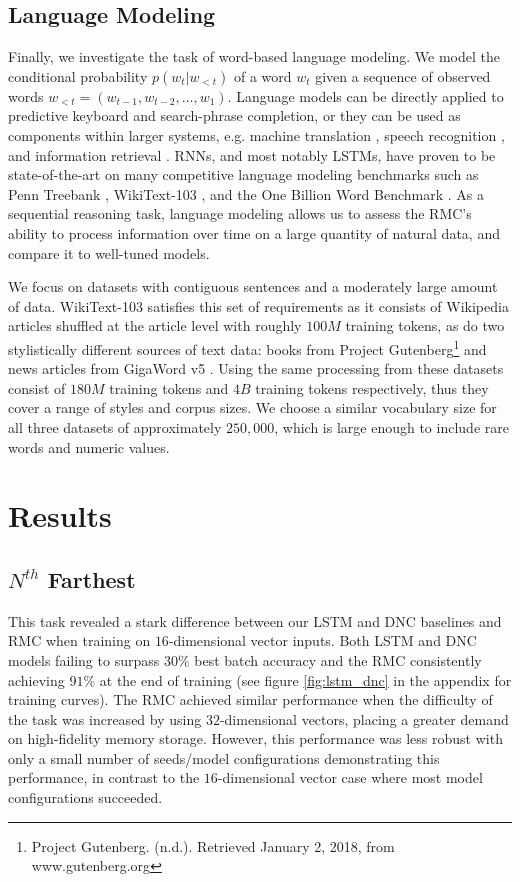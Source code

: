 \documentclass{article}
\begin{document}
\subsection{Language Modeling}
Finally, we investigate the task of word-based language modeling. We model the conditional probability $p(w_t | w_{<t})$ of a word $w_t$ given a sequence of observed words $w_{<t} = \left( w_{t-1}, w_{t-2}, \ldots, w_1 \right)$. Language models can be directly applied to predictive keyboard and search-phrase completion, or they can be used as components within larger systems, e.g. machine translation \cite{cho2014learning}, speech recognition \cite{bahdanau2016end}, and information retrieval \cite{hiemstra2001using}.  RNNs, and most notably LSTMs, have proven to be state-of-the-art on many competitive language modeling benchmarks such as Penn Treebank \cite{yang2017breaking, marcus1993building}, WikiText-103 \cite{rae2018fast, merity2016pointer}, and the One Billion Word Benchmark \cite{jozefowicz2016exploring, chelba2013one}. As a sequential reasoning task, language modeling allows us to assess the RMC's ability to process information over time on a large quantity of natural data, and compare it to well-tuned models. 

We focus on datasets with contiguous sentences and a moderately large amount of data. WikiText-103 satisfies this set of requirements as it consists of Wikipedia articles shuffled at the article level with roughly $100M$ training tokens, as do two stylistically different sources of text data: books from Project Gutenberg\footnote{Project Gutenberg. (n.d.). Retrieved January 2, 2018, from www.gutenberg.org} and news articles from GigaWord v5 \cite{parker2011english}. Using the same processing from \cite{rae2018fast} these datasets consist of $180M$ training tokens and $4B$ training tokens respectively, thus they cover a range of styles and corpus sizes. We choose a similar vocabulary size for all three datasets of approximately $250,000$, which is large enough to include rare words and numeric values. \section{Results}

\subsection{$N^{th}$ Farthest}
This task revealed a stark difference between our LSTM and DNC baselines and RMC when training on $16$-dimensional vector inputs. Both LSTM and DNC models failing to surpass $30\%$ best batch accuracy and the RMC consistently achieving $91\%$ at the end of training (see figure \ref{fig:lstm_dnc} in the appendix for training curves). The RMC achieved similar performance when the difficulty of the task was increased by using $32$-dimensional vectors, placing a greater demand on high-fidelity memory storage. However, this performance was less robust with only a small number of seeds/model configurations demonstrating this performance, in contrast to the $16$-dimensional vector case where most model configurations succeeded. 
\end{document}
